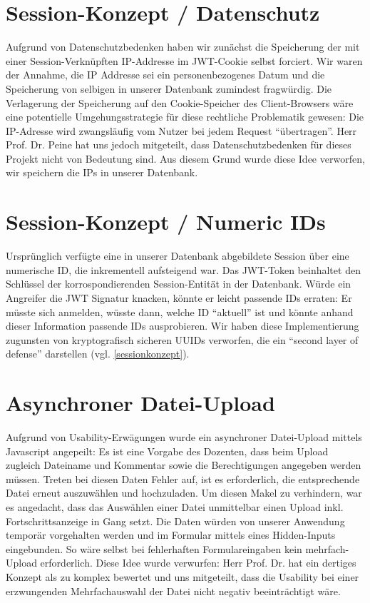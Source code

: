 \documentclass[12pt,DIV14,BCOR10mm,a4paper,parskip=half-,headsepline,headinclude,english,ngerman,bibliography=totocnumbered]{scrreprt}
\begin{document}
\section{Session-Konzept / Datenschutz}
Aufgrund von Datenschutzbedenken haben wir zunächst die Speicherung der mit einer Session-Verknüpften IP-Addresse im JWT-Cookie selbst forciert. Wir waren der Annahme, die IP Addresse sei ein personenbezogenes Datum und die Speicherung von selbigen in unserer Datenbank zumindest fragwürdig. Die Verlagerung der Speicherung auf den Cookie-Speicher des Client-Browsers wäre eine potentielle Umgehungsstrategie für diese rechtliche Problematik gewesen: Die IP-Adresse wird zwangsläufig vom Nutzer bei jedem Request \enquote{übertragen}. Herr Prof. Dr. Peine hat uns jedoch mitgeteilt, dass Datenschutzbedenken für dieses Projekt nicht von Bedeutung sind. Aus diesem Grund wurde diese Idee verworfen, wir speichern die IPs in unserer Datenbank.

\section{Session-Konzept / Numeric IDs}
Ursprünglich verfügte eine in unserer Datenbank abgebildete Session über eine numerische ID, die inkrementell aufsteigend war. Das JWT-Token beinhaltet den Schlüssel der korrospondierenden Session-Entität in der Datenbank. Würde ein Angreifer die JWT Signatur knacken, könnte er leicht passende IDs erraten: Er müsste sich anmelden, wüsste dann, welche ID \enquote{aktuell} ist und könnte anhand dieser Information passende IDs ausprobieren. Wir haben diese Implementierung zugunsten von kryptografisch sicheren UUIDs verworfen, die ein \enquote{second layer of defense} darstellen (vgl. \ref{sessionkonzept}).

\section{Asynchroner Datei-Upload}
Aufgrund von Usability-Erwägungen wurde ein asynchroner Datei-Upload mittels Javascript angepeilt: Es ist eine Vorgabe des Dozenten, dass beim Upload zugleich Dateiname und Kommentar sowie die Berechtigungen angegeben werden müssen. Treten bei diesen Daten Fehler auf, ist es erforderlich, die entsprechende Datei erneut auszuwählen und hochzuladen. Um diesen Makel zu verhindern, war es angedacht, dass das Auswählen einer Datei unmittelbar einen Upload inkl. Fortschrittsanzeige in Gang setzt. Die Daten würden von unserer Anwendung temporär vorgehalten werden und im Formular mittels eines Hidden-Inputs eingebunden. 
So wäre selbst bei fehlerhaften Formulareingaben kein mehrfach-Upload erforderlich. Diese Idee wurde verwurfen: Herr Prof. Dr. hat ein dertiges Konzept als zu komplex bewertet und uns mitgeteilt, dass die Usability bei einer erzwungenden Mehrfachauswahl der Datei nicht negativ beeinträchtigt wäre.
\end{document}
